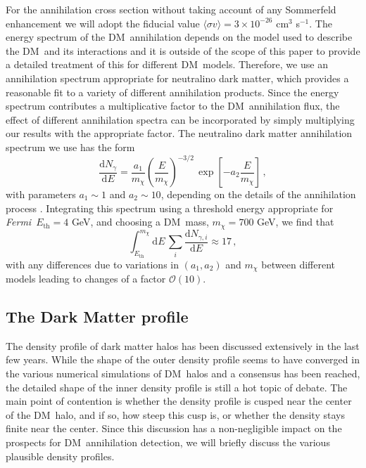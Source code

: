 \documentclass[aps,prd,twocolumn,amsmath,amssymb,floatfix,nofootinbib,10pt]{revtex4}
\newcommand{\Fermi}{\emph{Fermi}}
\newcommand{\DM}{DM}
\newcommand{\mdm}{\ensuremath{m_{\chi}}}
\newcommand{\dd}{\mathrm{d}}
\newcommand{\Ngamma}{\ensuremath{N_{\gamma}}}
\newcommand{\Ngammai}{\ensuremath{N_{\gamma,i}}}
\newcommand{\Eth}{\ensuremath{E_{\mathrm{th}}}}
\newcommand{\sigmaannv}{\ensuremath{\langle\sigma v\rangle}}
\newcommand{\order}{\ensuremath{\mathcal{O}}}
\begin{document}
For the annihilation cross section without taking account of any
Sommerfeld enhancement we will adopt the fiducial value $\sigmaannv =
3 \times 10^{-26} $ cm$^3$ s$^{-1}$. The energy spectrum of the \DM\
annihilation depends on the model used to describe the \DM\ and its
interactions and it is outside of the scope of this paper to provide a
detailed treatment of this for different \DM\ models. Therefore, we
use an annihilation spectrum appropriate for neutralino dark matter,
which provides a reasonable fit to a variety of different annihilation
products. Since the energy spectrum contributes a multiplicative
factor to the \DM\ annihilation flux, the effect of different
annihilation spectra can be incorporated by simply multiplying our
results with the appropriate factor. The neutralino dark matter
annihilation spectrum we use has the form
\cite{1998APh.....9..137B,2004PhRvD..70j3529F}
\begin{equation}\label{eq:annspectrum}
\frac{\dd \Ngamma}{\dd E} = \frac{a_1}{\mdm} \left(\frac{E}{\mdm}\right)^{-3/2}\, \exp\left[-a_2\frac{E}{\mdm}\right]\, ,
\end{equation}
with parameters $a_1\sim 1$ and $a_2 \sim 10$, depending on the
details of the annihilation process
\cite{2004PhRvD..70j3529F}. Integrating this spectrum using a
threshold energy appropriate for \Fermi\, $\Eth = 4$ GeV, and choosing
a \DM\ mass, $\mdm = 700$ GeV, we find that
\begin{equation}
\int_{\Eth}^{\mdm}\dd E\, \sum_i \frac{\dd
\Ngammai}{\dd E} \approx 17\, ,
\end{equation}
with any differences due to variations in $(a_1,a_2)$ and $\mdm$
between different models leading to changes of a factor $\order(10)$. 




\subsection{The Dark Matter profile}\label{sec:DMprofile}


The density profile of dark matter halos has been discussed
extensively in the last few years. While the shape of the outer
density profile seems to have converged in the various numerical
simulations of \DM\ halos and a consensus has been reached, the
detailed shape of the inner density profile is still a hot topic of
debate. The main point of contention is whether the density profile is
cusped near the center of the \DM\ halo, and if so, how steep this
cusp is, or whether the density stays finite near the center. Since
this discussion has a non-negligible impact on the prospects for \DM\
annihilation detection, we will briefly discuss the various plausible
density profiles.
\end{document}

